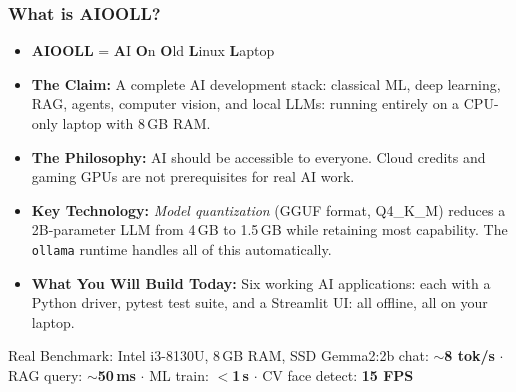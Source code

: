 \begin{frame}[fragile]\frametitle{What is AIOOLL?}
\begin{itemize}
  \item \textbf{AIOOLL} = \textbf{A}I \textbf{O}n \textbf{O}ld \textbf{L}inux \textbf{L}aptop
  \item \textbf{The Claim:} A complete AI development stack: classical ML, deep learning, RAG, agents, computer vision, and local LLMs: running entirely on a CPU-only laptop with 8\,GB RAM.
  \item \textbf{The Philosophy:} AI should be accessible to everyone. Cloud credits and gaming GPUs are not prerequisites for real AI work.
  \item \textbf{Key Technology:} \textit{Model quantization} (GGUF format, Q4\_K\_M) reduces a 2B-parameter LLM from 4\,GB to 1.5\,GB while retaining most capability. The \texttt{ollama} runtime handles all of this automatically.
  \item \textbf{What You Will Build Today:} Six working AI applications: each with a Python driver, pytest test suite, and a Streamlit UI: all offline, all on your laptop.
\end{itemize}
\begin{block}{Real Benchmark: Intel i3-8130U, 8\,GB RAM, SSD}
  Gemma2:2b chat: \textbf{$\sim$8 tok/s} $\cdot$ RAG query: \textbf{$\sim$50\,ms} $\cdot$ ML train: \textbf{$<$1\,s} $\cdot$ CV face detect: \textbf{15 FPS}
\end{block}
\end{frame}

